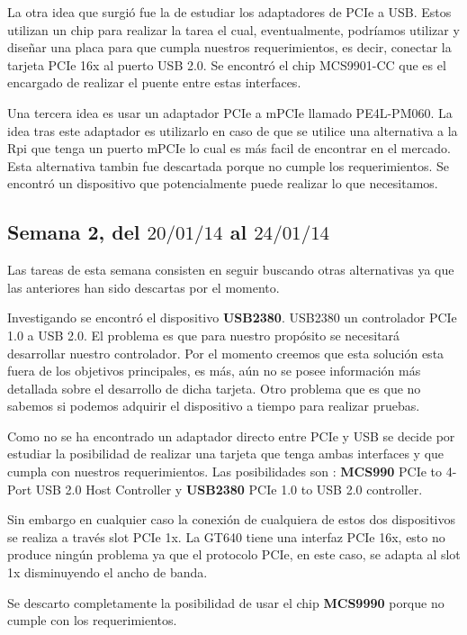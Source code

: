 \documentclass[11pt,oneside,titlepage]{article}
\begin{document}
La otra idea que surgió fue la de estudiar los adaptadores de PCIe a USB. Estos
utilizan un chip para realizar la tarea el cual, eventualmente, podríamos
utilizar y diseñar una placa para que cumpla nuestros requerimientos, es decir,
conectar la tarjeta PCIe 16x al puerto USB 2.0. Se encontró el chip MCS9901-CC
que es el encargado de realizar el puente entre estas interfaces.  

Una tercera idea es usar un adaptador PCIe a mPCIe llamado PE4L-PM060.  La idea
tras este adaptador es utilizarlo en caso de que se utilice una alternativa a
la Rpi que tenga un puerto mPCIe lo cual es más facil de encontrar en el
mercado.  Esta alternativa tambin fue descartada porque no cumple los
requerimientos. Se encontró un dispositivo que potencialmente puede realizar lo
que necesitamos. 

\subsection*{Semana 2, del $20/01/14$ al $24/01/14$}

Las tareas de esta semana consisten en seguir buscando otras alternativas ya que las
anteriores han sido descartas por el momento.

Investigando se encontró el dispositivo \textbf{USB2380}. USB2380 un controlador
PCIe 1.0 a USB 2.0. El problema es que para nuestro propósito se necesitará
desarrollar nuestro controlador. Por el momento creemos que esta solución esta
fuera de los objetivos principales, es más, aún no se posee información más
detallada sobre el desarrollo de dicha tarjeta. Otro problema que es que no
sabemos si podemos adquirir el dispositivo a tiempo para realizar pruebas.

Como no se ha encontrado un adaptador directo entre PCIe y USB se decide por
estudiar la posibilidad de realizar una tarjeta que tenga ambas interfaces y que
cumpla con nuestros requerimientos. Las posibilidades son : \textbf{MCS990} PCIe
to 4-Port USB 2.0 Host Controller y \textbf{USB2380} PCIe 1.0 to USB 2.0
controller.

Sin embargo en cualquier caso la conexión de cualquiera de estos dos dispositivos
se realiza a través slot PCIe 1x. La GT640 tiene una interfaz PCIe 16x, esto no
produce ningún problema ya que el protocolo PCIe, en este caso, se adapta al slot
1x disminuyendo el ancho de banda.

Se descarto completamente la posibilidad de usar el chip \textbf{MCS9990} porque
no cumple con los requerimientos.
\end{document}

